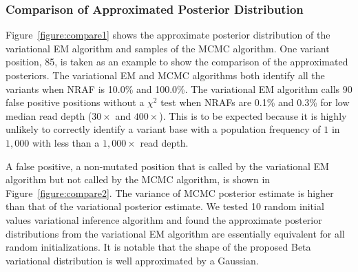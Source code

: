 \documentclass{bmcart}
\begin{document}
\subsubsection{Comparison of Approximated Posterior Distribution}

Figure~\ref{figure:compare1} shows the approximate posterior distribution of the variational EM algorithm and samples of the MCMC algorithm.
One variant position, 85, is taken as an example to show the comparison of the approximated posteriors.
The variational EM and MCMC algorithms both identify all the variants when NRAF is 10.0\% and 100.0\%.
The variational EM algorithm calls 90 false positive positions without a $\chi^2$ test when NRAFs are 0.1\% and 0.3\% for low median read depth ($30\times$ and $400\times$).
This is to be expected because it is highly unlikely to correctly identify a variant base with a population frequency of $1$ in $1,000$ with less than a $1,000\times$ read depth.

A false positive, a non-mutated position that is called by the variational EM algorithm but not called by the MCMC algorithm, is shown in Figure~\ref{figure:compare2}.
The variance of MCMC posterior estimate is higher than that of the variational posterior estimate.
We tested 10 random initial values variational inference algorithm and found the approximate posterior distributions from the variational EM algorithm are essentially equivalent for all random initializations.
It is notable that the shape of the proposed Beta variational distribution is well approximated by a Gaussian.
\end{document}
